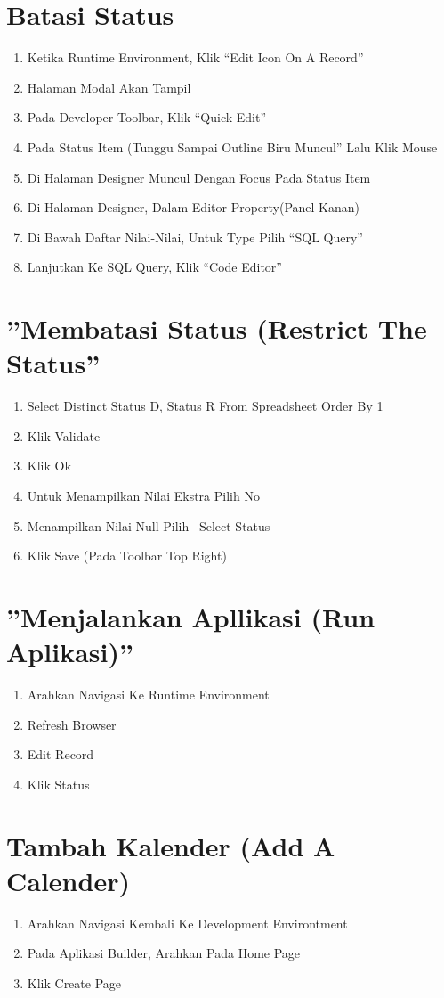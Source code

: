 \documentclass{article}
\begin{document}
\section{ Batasi Status}
\begin{enumerate}
    \item Ketika Runtime Environment, Klik “Edit Icon On A Record”
    \item Halaman Modal Akan Tampil
    \item Pada Developer Toolbar, Klik “Quick Edit”
    \item Pada Status Item (Tunggu Sampai Outline Biru Muncul” Lalu Klik Mouse
    \item Di Halaman Designer Muncul Dengan Focus Pada Status Item
    \item Di Halaman Designer, Dalam Editor Property(Panel Kanan)
    \item Di Bawah Daftar Nilai-Nilai, Untuk Type Pilih “SQL Query”
    \item Lanjutkan Ke SQL Query, Klik “Code Editor”
\end{enumerate}
\section{ ”Membatasi Status (Restrict The Status”}
\usepackage {Dalam Kode Masukkan Seperti Ini}
\begin{enumerate}
    \item Select Distinct Status D, Status R From Spreadsheet Order By 1
    \item Klik Validate
    \item Klik Ok
    \item Untuk Menampilkan Nilai Ekstra Pilih No
    \item Menampilkan Nilai Null Pilih –Select Status-
    \item Klik Save (Pada Toolbar Top Right)
\end{enumerate}
\section{ ”Menjalankan Apllikasi (Run Aplikasi)”}
\begin{enumerate}
    \item Arahkan Navigasi Ke Runtime Environment
    \item Refresh Browser
    \item Edit Record
    \item Klik Status
\end{enumerate}
\section{ Tambah Kalender (Add A Calender)}
\begin{enumerate}
    \item Arahkan Navigasi Kembali Ke Development Environtment
    \item Pada Aplikasi Builder, Arahkan Pada Home Page
    \item Klik Create Page
\end{enumerate}
\end{document}

